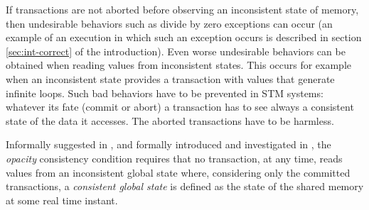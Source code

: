 \documentclass[runningheads,a4paper]{article}
\begin{document}
If transactions are not aborted before observing an inconsistent state of memory, then undesirable
behaviors such as divide by zero exceptions can occur
(an example of an execution in which such an exception occurs
is described in section \ref{sec:int-correct} of the introduction).
Even worse undesirable  behaviors can  be
obtained when  reading values from inconsistent  states. 
This occurs for example when an inconsistent state provides a transaction 
with values that generate infinite loops.
Such  bad  behaviors have  to  be prevented in  STM systems: 
whatever its fate (commit or abort) a transaction has to see always  
a consistent  state of  the data it  accesses. The aborted transactions
have to be harmless.  



Informally suggested  in   \cite{DSS06},  and  formally introduced  
and investigated in \cite{GK08}, the  {\it   opacity} consistency condition
requires  that  no transaction, at any time, reads  values from an inconsistent global 
state  where, considering only the committed transactions,  
a  {\it consistent  global  state} is defined as the  
state of the shared memory at some real time instant. 
%
\end{document}
